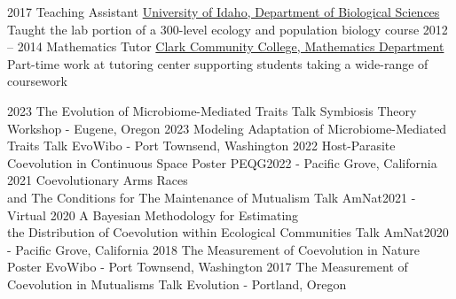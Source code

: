 \documentclass[9pt]{developercv} %
\begin{document}
\vspace{-5 pt}
\begin{entrylist}
	\entry
        {2017}
		{Teaching Assistant}
		{\href{https://www.uidaho.edu/sci/biology}{University of Idaho, Department of Biological Sciences}}
        {Taught the lab portion of a 300-level ecology and population biology course}
        \entry
        {2012 -- 2014}
		{Mathematics Tutor}
		{\href{https://www.clark.edu/academics/programs/dept/mathematics/}{Clark Community College, Mathematics Department}}
        {Part-time work at tutoring center supporting students taking a wide-range of coursework}
\end{entrylist}

\vspace{-10 pt}
\begin{preslist}
    \pres
    {2023}
    {The Evolution of Microbiome-Mediated Traits}
    {Talk}
    {Symbiosis Theory Workshop - Eugene, Oregon}
    \pres
    {2023}
    {Modeling Adaptation of Microbiome-Mediated Traits}
    {Talk}
    {EvoWibo - Port Townsend, Washington}
    \pres
    {2022}
    {Host-Parasite Coevolution in Continuous Space}
    {Poster}
    {PEQG2022 - Pacific Grove, California}
    \pres
    {2021}
    {Coevolutionary Arms Races\\ and The Conditions for The Maintenance of Mutualism}
    {Talk}
    {AmNat2021 - Virtual}
    \pres
    {2020}
    {A Bayesian Methodology for Estimating\\ the Distribution of Coevolution within Ecological Communities}
    {Talk}
    {AmNat2020 - Pacific Grove, California}
    \pres
    {2018}
    {The Measurement of Coevolution in Nature}
    {Poster}
    {EvoWibo - Port Townsend, Washington}
    \pres
    {2017}
    {The Measurement of Coevolution in Mutualisms}
    {Talk}
    {Evolution - Portland, Oregon}
\end{preslist}
\end{document}
